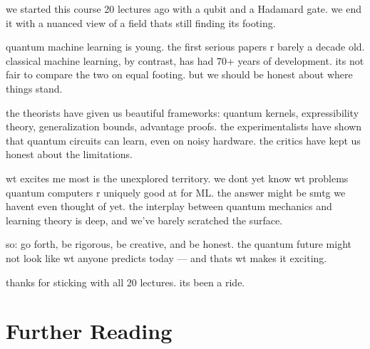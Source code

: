\documentclass[11pt,a4paper]{article}
\theoremstyle{definition}
\theoremstyle{remark}
\begin{document}
we started this course 20 lectures ago with a qubit and a Hadamard gate. we end it with a nuanced view of a field thats still finding its footing.

quantum machine learning is young. the first serious papers r barely a decade old. classical machine learning, by contrast, has had 70+ years of development. its not fair to compare the two on equal footing. but we should be honest about where things stand.

the theorists have given us beautiful frameworks: quantum kernels, expressibility theory, generalization bounds, advantage proofs. the experimentalists have shown that quantum circuits can learn, even on noisy hardware. the critics have kept us honest about the limitations.

wt excites me most is the unexplored territory. we dont yet know wt problems quantum computers r uniquely good at for ML. the answer might be smtg we havent even thought of yet. the interplay between quantum mechanics and learning theory is deep, and we've barely scratched the surface.

so: go forth, be rigorous, be creative, and be honest. the quantum future might not look like wt anyone predicts today --- and thats wt makes it exciting.

thanks for sticking with all 20 lectures. its been a ride.

\section{Further Reading}
\end{document}
